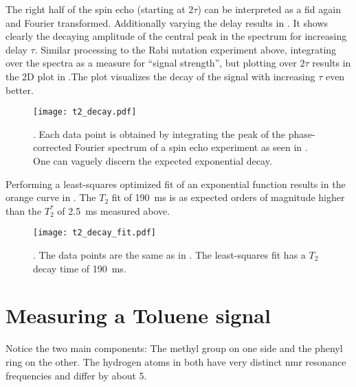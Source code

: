 The right half of the spin echo (starting at \(2\tau\)) can be interpreted as a \acrshort{fid} again and Fourier transformed. Additionally varying the delay results in . It shows clearly the decaying amplitude of the central peak in the spectrum for increasing delay \(\tau\). Similar processing to the Rabi nutation experiment above, integrating over the spectra as a measure for \enquote{signal strength}, but plotting over \(2\tau\) results in the 2D plot in .The plot visualizes the decay of the signal with increasing \(\tau\) even better.

\begin{figure}[h!bt]
    \centering
    \texttt{[image: t2\_decay.pdf]}
    \caption{. Each data point is obtained by integrating the peak of the phase-corrected Fourier spectrum of a spin echo experiment as seen in . One can vaguely discern the expected exponential decay.}
\end{figure}

Performing a least-squares optimized fit of an exponential function results in the orange curve in . The \(T_2\) fit of \qty{190}{\milli\second} is as expected orders of magnitude higher than the \(T_2^*\) of \qty{2.5}{\milli\second} measured above.

\begin{figure}[h!bt]
    \centering
    \texttt{[image: t2\_decay\_fit.pdf]}
    \caption{. The data points are the same as in . The least-squares fit has a \(T_2\) decay time of \qty{190}{\milli\second}.}
\end{figure}

\section{Measuring a Toluene signal}

\begin{marginfigure}
    \centering
    
    \caption{ Notice the two main components: The  methyl group on one side and the phenyl ring on the other. The hydrogen atoms in both have very distinct \acrshort{nmr} resonance frequencies and differ by about \qty{5}{\partspermillion}.}
\end{marginfigure}

